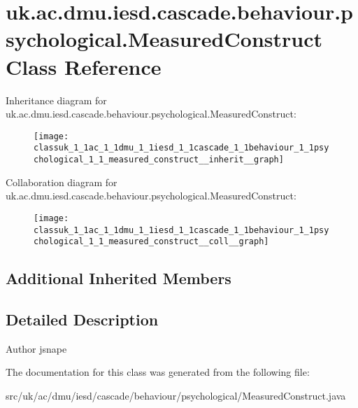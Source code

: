 \hypertarget{classuk_1_1ac_1_1dmu_1_1iesd_1_1cascade_1_1behaviour_1_1psychological_1_1_measured_construct}{\section{uk.\-ac.\-dmu.\-iesd.\-cascade.\-behaviour.\-psychological.\-Measured\-Construct Class Reference}
\label{classuk_1_1ac_1_1dmu_1_1iesd_1_1cascade_1_1behaviour_1_1psychological_1_1_measured_construct}
}


Inheritance diagram for uk.\-ac.\-dmu.\-iesd.\-cascade.\-behaviour.\-psychological.\-Measured\-Construct\-:\nopagebreak
\begin{figure}[H]
\begin{center}
\leavevmode
\texttt{[image: classuk\_1\_1ac\_1\_1dmu\_1\_1iesd\_1\_1cascade\_1\_1behaviour\_1\_1psychological\_1\_1\_measured\_construct\_\_inherit\_\_graph]}
\end{center}
\end{figure}


Collaboration diagram for uk.\-ac.\-dmu.\-iesd.\-cascade.\-behaviour.\-psychological.\-Measured\-Construct\-:\nopagebreak
\begin{figure}[H]
\begin{center}
\leavevmode
\texttt{[image: classuk\_1\_1ac\_1\_1dmu\_1\_1iesd\_1\_1cascade\_1\_1behaviour\_1\_1psychological\_1\_1\_measured\_construct\_\_coll\_\_graph]}
\end{center}
\end{figure}
\subsection*{Additional Inherited Members}


\subsection{Detailed Description}
\begin{DoxyAuthor}{Author}
jsnape 
\end{DoxyAuthor}


The documentation for this class was generated from the following file\-:\begin{DoxyCompactItemize}
\item 
src/uk/ac/dmu/iesd/cascade/behaviour/psychological/Measured\-Construct.\-java\end{DoxyCompactItemize}
